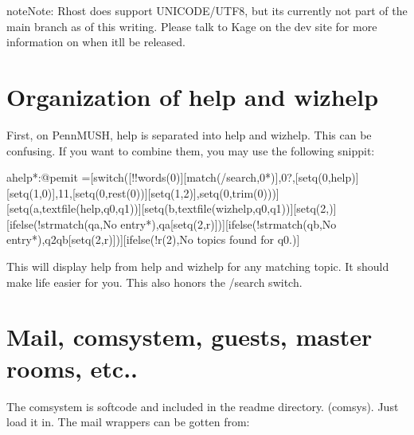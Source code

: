 \documentclass[letterpaper,10pt,english]{sphinxmanual}
\begin{document}
\begin{sphinxadmonition}{note}{Note:}
\sphinxAtStartPar
Rhost does support UNICODE/UTF8, but it\textquotesingle{}s currently not part of the main
branch as of this writing.  Please talk to Kage on the dev site for more
information on when it\textquotesingle{}ll be released.
\end{sphinxadmonition}


\section{Organization of help and wizhelp}
\label{\detokenize{differences:organization-of-help-and-wizhelp}}
\sphinxAtStartPar
First, on PennMUSH, help is separated into \textquotesingle{}help\textquotesingle{} and \textquotesingle{}wizhelp\textquotesingle{}.  This can
be confusing. If you want to \textquotesingle{}combine\textquotesingle{} them, you may use the following snippit:

\begin{sphinxVerbatim}[commandchars=\\\{\}]
\PYGZdl{}ahelp*:@pemit \PYGZpc{}\PYGZsh{}=[switch([!!words(\PYGZpc{}0)][match(/search,\PYGZpc{}0*)],0?,[setq(0,help)][setq(1,0)],11,[setq(0,rest(\PYGZpc{}0))][setq(1,2)],setq(0,trim(\PYGZpc{}0)))][setq(a,textfile(help,\PYGZpc{}q0,\PYGZpc{}q1))][setq(b,textfile(wizhelp,\PYGZpc{}q0,\PYGZpc{}q1))][setq(2,)][ifelse(!strmatch(\PYGZpc{}qa,No entry*),\PYGZpc{}qa[setq(2,\PYGZpc{}r)])][ifelse(!strmatch(\PYGZpc{}qb,No entry*),\PYGZpc{}q2\PYGZpc{}qb[setq(2,\PYGZpc{}r)])][ifelse(!\PYGZdl{}r(2),No topics found for \PYGZsq{}\PYGZpc{}q0\PYGZsq{}.)]
\end{sphinxVerbatim}

\sphinxAtStartPar
This will display help from help and wizhelp for any matching topic.  It
should make life easier for you.  This also honors the /search switch.


\section{Mail, comsystem, guests, master rooms, etc..}
\label{\detokenize{differences:mail-comsystem-guests-master-rooms-etc}}
\sphinxAtStartPar
The comsystem is softcode and included in the readme directory. (comsys).
Just load it in.  The mail wrappers can be gotten from:

\begin{sphinxVerbatim}[commandchars=\\\{\}]
      
\end{sphinxVerbatim}
\end{document}

